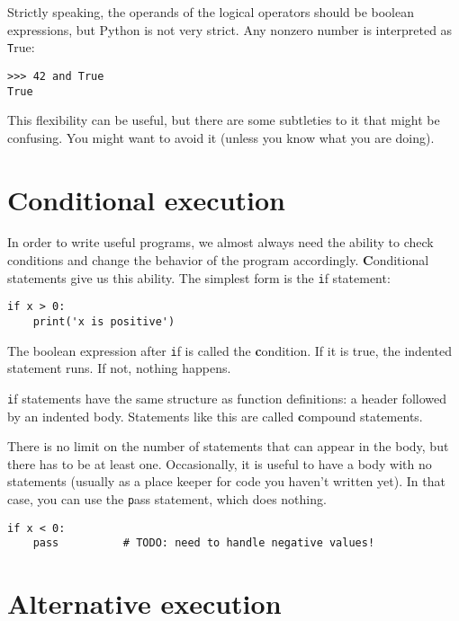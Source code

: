 \documentclass[
DIV=11,
fontsize=12,
twoside,
headinclude=false,
titlepage=firstiscover,
abstract=true,
headsepline=true,
footsepline=true,
chapterprefix=true, %
headings=big,
bibliography=totoc,%
captions=tableheading
]{scrbook}
\theoremstyle{definition}
\begin{document}
Strictly speaking, the operands of the logical operators should be
boolean expressions, but Python is not very strict.
Any nonzero number is interpreted as {\texttt True}:

\begin{lstlisting}
>>> 42 and True
True
\end{lstlisting}
%
This flexibility can be useful, but there are some subtleties to
it that might be confusing.  You might want to avoid it (unless
you know what you are doing).


\section{Conditional execution}
\label{conditional.execution}

In order to write useful programs, we almost always need the ability
to check conditions and change the behavior of the program
accordingly.  {\textbf Conditional statements} give us this ability.  The
simplest form is the {\texttt if} statement:

\begin{lstlisting}
if x > 0:
    print('x is positive')
\end{lstlisting}
%
The boolean expression after {\texttt if} is
called the {\textbf condition}.  If it is true, the indented
statement runs.  If not, nothing happens.

{\texttt if} statements have the same structure as function definitions:
a header followed by an indented body.  Statements like this are
called {\textbf compound statements}.

There is no limit on the number of statements that can appear in
the body, but there has to be at least one.
Occasionally, it is useful to have a body with no statements (usually
as a place keeper for code you haven't written yet).  In that
case, you can use the {\texttt pass} statement, which does nothing.

\begin{lstlisting}
if x < 0:
    pass          # TODO: need to handle negative values!
\end{lstlisting}
%

\section{Alternative execution}
\label{alternative.execution}
\end{document}
